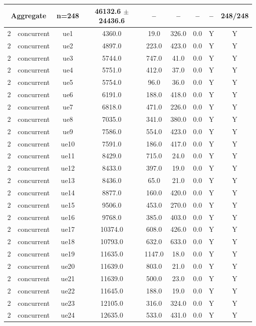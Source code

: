 \begin{table}[ht]
\begin{tabular}{|c|c|c|c|c|c|c|c|c|}
\multicolumn{2}{|c|}{\textbf{Aggregate}} & n=248 & 46132.6 $\pm$ 24436.6 & -- & -- & -- & -- & 248/248 \\
\hline
2 & concurrent & ue1 & 4360.0 & 19.0 & 326.0 & 0.0 & Y & Y \\
2 & concurrent & ue2 & 4897.0 & 223.0 & 423.0 & 0.0 & Y & Y \\
2 & concurrent & ue3 & 5744.0 & 747.0 & 41.0 & 0.0 & Y & Y \\
2 & concurrent & ue4 & 5751.0 & 412.0 & 37.0 & 0.0 & Y & Y \\
2 & concurrent & ue5 & 5754.0 & 96.0 & 36.0 & 0.0 & Y & Y \\
2 & concurrent & ue6 & 6191.0 & 188.0 & 418.0 & 0.0 & Y & Y \\
2 & concurrent & ue7 & 6818.0 & 471.0 & 226.0 & 0.0 & Y & Y \\
2 & concurrent & ue8 & 7035.0 & 341.0 & 380.0 & 0.0 & Y & Y \\
2 & concurrent & ue9 & 7586.0 & 554.0 & 423.0 & 0.0 & Y & Y \\
2 & concurrent & ue10 & 7591.0 & 186.0 & 417.0 & 0.0 & Y & Y \\
2 & concurrent & ue11 & 8429.0 & 715.0 & 24.0 & 0.0 & Y & Y \\
2 & concurrent & ue12 & 8433.0 & 397.0 & 19.0 & 0.0 & Y & Y \\
2 & concurrent & ue13 & 8436.0 & 65.0 & 21.0 & 0.0 & Y & Y \\
2 & concurrent & ue14 & 8877.0 & 160.0 & 420.0 & 0.0 & Y & Y \\
2 & concurrent & ue15 & 9506.0 & 453.0 & 270.0 & 0.0 & Y & Y \\
2 & concurrent & ue16 & 9768.0 & 385.0 & 403.0 & 0.0 & Y & Y \\
2 & concurrent & ue17 & 10374.0 & 608.0 & 426.0 & 0.0 & Y & Y \\
2 & concurrent & ue18 & 10793.0 & 632.0 & 633.0 & 0.0 & Y & Y \\
2 & concurrent & ue19 & 11635.0 & 1147.0 & 18.0 & 0.0 & Y & Y \\
2 & concurrent & ue20 & 11639.0 & 803.0 & 21.0 & 0.0 & Y & Y \\
2 & concurrent & ue21 & 11639.0 & 500.0 & 23.0 & 0.0 & Y & Y \\
2 & concurrent & ue22 & 11645.0 & 188.0 & 19.0 & 0.0 & Y & Y \\
2 & concurrent & ue23 & 12105.0 & 316.0 & 324.0 & 0.0 & Y & Y \\
2 & concurrent & ue24 & 12635.0 & 533.0 & 431.0 & 0.0 & Y & Y \\

\end{tabular}
\end{table}
